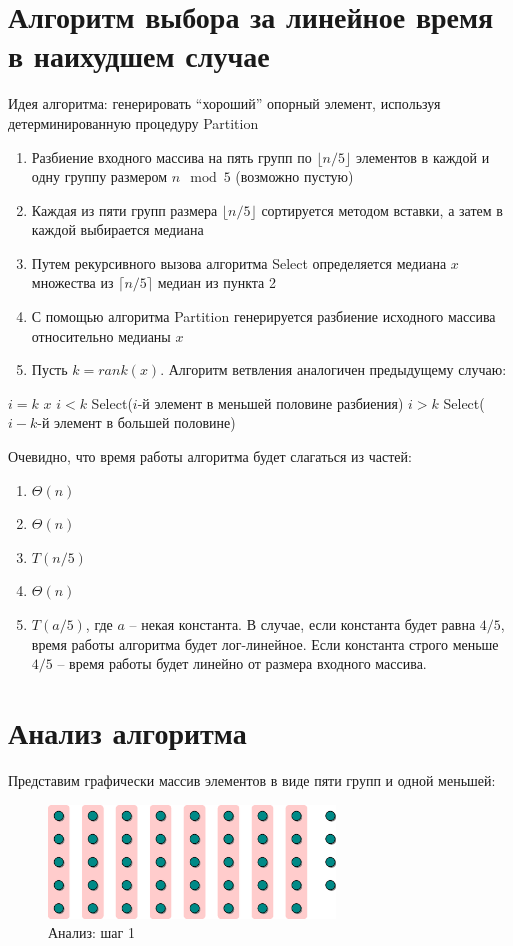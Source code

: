 \documentclass[11pt]{article}
\begin{document}
\section{Алгоритм выбора за линейное время в наихудшем случае}
Идея алгоритма: генерировать ``хороший'' опорный элемент, используя детерминированную процедуру Partition
\begin{enumerate}
\item Разбиение входного массива на пять групп по $\lfloor n/5 \rfloor$ элементов в каждой и одну группу размером $n \mod{5}$ (возможно пустую)
\item Каждая из пяти групп размера $\lfloor n/5 \rfloor$ сортируется методом вставки, а затем в каждой выбирается медиана
\item Путем рекурсивного вызова алгоритма Select определяется медиана $x$ множества из $\lceil n/5 \rceil$ медиан из пункта 2
\item С помощью алгоритма Partition генерируется разбиение исходного массива относительно медианы $x$
\item Пусть $k = rank(x)$. Алгоритм ветвления аналогичен предыдущему случаю:
\end{enumerate}
\begin{codebox}
\li \If $i = k$ 
\li \Then \Return $x$
\li \ElseIf $i < k$
\li \Then \Return Select($i$-й элемент в меньшей половине разбиения)
\li \ElseIf $i > k$
\li \Then \Return Select($i-k$-й элемент в большей половине)
\End
\end{codebox}

Очевидно, что время работы алгоритма будет слагаться из частей:
\begin{enumerate}
\item $\Theta(n)$
\item $\Theta(n)$
\item $T(n/5)$
\item $\Theta(n)$
\item $T(a/5)$, где $a$ -- некая константа. В случае, если константа будет равна $4/5$, время работы алгоритма будет лог-линейное. Если константа строго меньше $4/5$ -- время работы будет линейно от размера входного массива.
\end{enumerate}

\section{Анализ алгоритма}
Представим графически массив элементов в виде пяти групп и одной меньшей:
\begin{figure}[ht]
  \centering
  \includegraphics[width=3in]{lecture6/analysis1.eps}
  \caption{Анализ: шаг 1}
  \label{fig:analysis1}
\end{figure}
\end{document}
